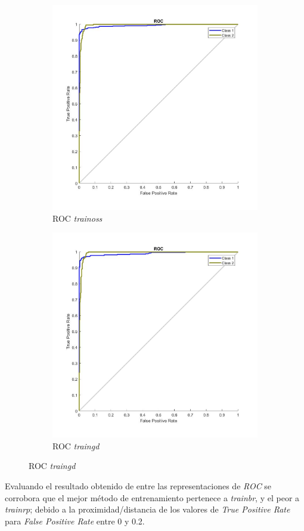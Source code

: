 \documentclass{article}
\begin{document}
\begin{figure}[H]
\begin{subfigure}{0.4\textwidth}
  \includegraphics[width=0.8\linewidth]{../images/I_ex4_roc_cancer_dataset_trainoss.jpg}
  \caption{ROC \textit{trainoss}}
 \end{subfigure}
 \begin{subfigure}{0.4\textwidth}
  \includegraphics[width=0.8\linewidth]{../images/I_ex4_roc_cancer_dataset_trainrp.jpg}  
  \caption{ROC \textit{traingd}}
 \end{subfigure}
\end{figure}

Evaluando el resultado obtenido de entre las representaciones de \textit{ROC} se
corrobora que el mejor método de entrenamiento pertenece a \textit{trainbr}, y
el peor a \textit{trainrp}; debido a la proximidad/distancia de los valores de
\textit{True Positive Rate} para \textit{False Positive Rate} entre 0 y 0.2.
\end{document}
